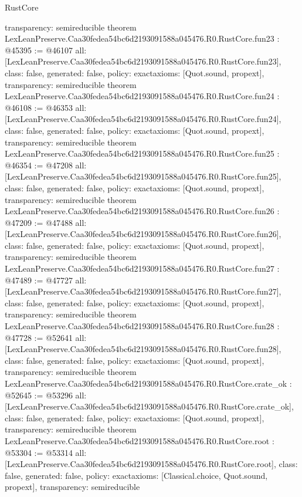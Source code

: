 \begin{lexlean}{RustCore}
\begin{coremodule}
{  transparency: semireducible
}
theorem LexLeanPreserve.Caa30fedea54bc6d2193091588a045476.R0.RustCore.fun23 : @45395 := @46107 {
  all: [LexLeanPreserve.Caa30fedea54bc6d2193091588a045476.R0.RustCore.fun23],
  class: false,
  generated: false,
  policy: exact{axioms: [Quot.sound, propext]},
  transparency: semireducible
}
theorem LexLeanPreserve.Caa30fedea54bc6d2193091588a045476.R0.RustCore.fun24 : @46108 := @46353 {
  all: [LexLeanPreserve.Caa30fedea54bc6d2193091588a045476.R0.RustCore.fun24],
  class: false,
  generated: false,
  policy: exact{axioms: [Quot.sound, propext]},
  transparency: semireducible
}
theorem LexLeanPreserve.Caa30fedea54bc6d2193091588a045476.R0.RustCore.fun25 : @46354 := @47208 {
  all: [LexLeanPreserve.Caa30fedea54bc6d2193091588a045476.R0.RustCore.fun25],
  class: false,
  generated: false,
  policy: exact{axioms: [Quot.sound, propext]},
  transparency: semireducible
}
theorem LexLeanPreserve.Caa30fedea54bc6d2193091588a045476.R0.RustCore.fun26 : @47209 := @47488 {
  all: [LexLeanPreserve.Caa30fedea54bc6d2193091588a045476.R0.RustCore.fun26],
  class: false,
  generated: false,
  policy: exact{axioms: [Quot.sound, propext]},
  transparency: semireducible
}
theorem LexLeanPreserve.Caa30fedea54bc6d2193091588a045476.R0.RustCore.fun27 : @47489 := @47727 {
  all: [LexLeanPreserve.Caa30fedea54bc6d2193091588a045476.R0.RustCore.fun27],
  class: false,
  generated: false,
  policy: exact{axioms: [Quot.sound, propext]},
  transparency: semireducible
}
theorem LexLeanPreserve.Caa30fedea54bc6d2193091588a045476.R0.RustCore.fun28 : @47728 := @52641 {
  all: [LexLeanPreserve.Caa30fedea54bc6d2193091588a045476.R0.RustCore.fun28],
  class: false,
  generated: false,
  policy: exact{axioms: [Quot.sound, propext]},
  transparency: semireducible
}
theorem LexLeanPreserve.Caa30fedea54bc6d2193091588a045476.R0.RustCore.crate_ok : @52645 := @53296 {
  all: [LexLeanPreserve.Caa30fedea54bc6d2193091588a045476.R0.RustCore.crate_ok],
  class: false,
  generated: false,
  policy: exact{axioms: [Quot.sound, propext]},
  transparency: semireducible
}
theorem LexLeanPreserve.Caa30fedea54bc6d2193091588a045476.R0.RustCore.root : @53304 := @53314 {
  all: [LexLeanPreserve.Caa30fedea54bc6d2193091588a045476.R0.RustCore.root],
  class: false,
  generated: false,
  policy: exact{axioms: [Classical.choice, Quot.sound, propext]},
  transparency: semireducible
}


\end{coremodule}
\end{lexlean}
